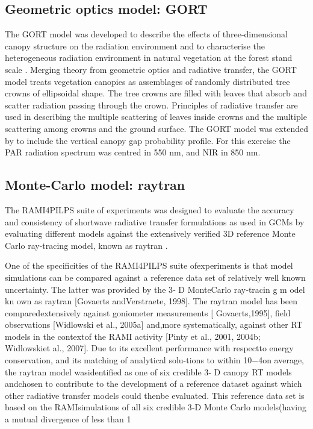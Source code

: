 \documentclass[a4paper,11pt]{report}
\begin{document}
\subsection{Geometric optics model: GORT}\label{section:gort}
The GORT model was developed to describe the effects of three-dimensional canopy structure on the radiation environment and to characterise the heterogeneous radiation environment in natural vegetation at the forest stand scale \citep{Li1995}. Merging theory from geometric optics and radiative transfer, the GORT model treats vegetation canopies as assemblages of randomly distributed tree crowns of ellipsoidal shape. The tree crowns are filled with leaves that absorb and scatter radiation passing through the crown. Principles of radiative transfer are used in describing the multiple scattering of leaves inside crowns and the multiple scattering among crowns and the ground surface. The GORT model was extended by \citet{Ni1997} to include the vertical canopy gap probability profile. For this exercise the PAR radiation spectrum was centred in 550 nm, and NIR in 850 nm.

\subsection{Monte-Carlo model: raytran}\label{section:raytran}

The RAMI4PILPS \citep{Widlowski2011} suite of experiments was designed to evaluate the accuracy and consistency of shortwave radiative transfer formulations as used in GCMs by evaluating different models against the extensively verified 3D reference Monte Carlo ray-tracing model, known as raytran \citep{Govaerts1995}.

One of the specificities of the RAMI4PILPS suite ofexperiments is that model simulations can be compared against a reference data set of relatively well known uncertainty. The latter was provided by the 3‐ D MonteCarlo ray‐tracin g m odel kn own as raytran [Govaerts andVerstraete, 1998]. The raytran model has been comparedextensively against goniometer measurements [ Govaerts,1995], field observations [Widlowski et al., 2005a] and,more systematically, against other RT models in the contextof the RAMI activity [Pinty et al., 2001, 2004b; Widlowskiet al., 2007]. Due to its excellent performance with respectto energy conservation, and its matching of analytical solu-tions to within 10−4on average, the raytran model wasidentified as one of six credible 3‐ D canopy RT models andchosen to contribute to the development of a reference dataset against which other radiative transfer models could thenbe evaluated. This reference data set is based on the RAMIsimulations of all six credible 3‐D Monte Carlo models(having a mutual divergence of less than 1%
\end{document}
